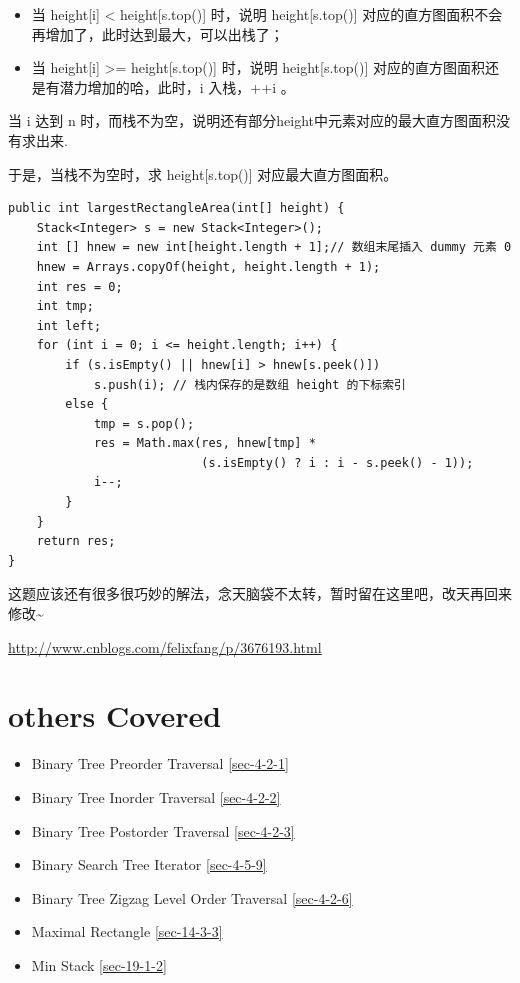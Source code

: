 \documentclass[12pt]{book}
\begin{document}
\begin{enumerate}
\begin{itemize}
\item 当 height[i] < height[s.top()] 时，说明 height[s.top()] 对应的直方图面积不会再增加了，此时达到最大，可以出栈了；

\item 当 height[i] >= height[s.top()] 时，说明 height[s.top()] 对应的直方图面积还是有潜力增加的哈，此时，i 入栈，++i 。
\end{itemize}

当 i 达到 n 时，而栈不为空，说明还有部分height中元素对应的最大直方图面积没有求出来.

于是，当栈不为空时，求 height[s.top()] 对应最大直方图面积。

\lstset{language=java,label= ,caption= ,numbers=none}
\begin{lstlisting}
public int largestRectangleArea(int[] height) {
    Stack<Integer> s = new Stack<Integer>();
    int [] hnew = new int[height.length + 1];// 数组末尾插入 dummy 元素 0
    hnew = Arrays.copyOf(height, height.length + 1);
    int res = 0; 
    int tmp;     
    int left;
    for (int i = 0; i <= height.length; i++) {
        if (s.isEmpty() || hnew[i] > hnew[s.peek()])
            s.push(i); // 栈内保存的是数组 height 的下标索引
        else {
            tmp = s.pop();
            res = Math.max(res, hnew[tmp] * 
                           (s.isEmpty() ? i : i - s.peek() - 1));
            i--;
        }
    }
    return res;
}
\end{lstlisting}

这题应该还有很多很巧妙的解法，念天脑袋不太转，暂时留在这里吧，改天再回来修改\textasciitilde{}~

\url{http://www.cnblogs.com/felixfang/p/3676193.html}
\end{enumerate}

\section{others Covered}
\label{sec-5-4}
\begin{itemize}
\item Binary Tree Preorder Traversal
\ref{sec-4-2-1}
\item Binary Tree Inorder Traversal
\ref{sec-4-2-2}
\item Binary Tree Postorder Traversal
\ref{sec-4-2-3}
\item Binary Search Tree Iterator        
\ref{sec-4-5-9}
\item Binary Tree Zigzag Level Order Traversal
\ref{sec-4-2-6}
\item Maximal Rectangle
\ref{sec-14-3-3}
\item Min Stack
\ref{sec-19-1-2}
\end{itemize}
\end{document}
